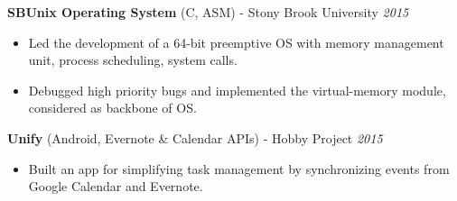 \documentclass[12pt]{article}
\newcommand{\sectionHeading}[1]{
\vspace{-15pt}
\section*{\small{#1}}
\vspace{-10pt}
\hrule
\vspace{8pt}
}
\newcommand {\projectSectionSubheading}[4]{
    \noindent \small{\textbf{#1} \textit{(#2)} : #3  \hfill \textit{#4}} \\
    \vspace{-10pt}
}
\newcommand {\projectSectionSubheadingAlternate}[4]{
    \noindent \small{\textbf{#1} (#3) - #2 \hfill \textit{#4}} \\
    \vspace{-22pt}
}
\newcommand {\projectSectionSubheadingAlternateNew}[2]{
    \noindent \small{\textbf{#1} \hfill \textit{#2}} \\
    \vspace{-22pt}
}
\newcommand{\sectionListStart}{
    \begin{itemize}[label={\small{\textbullet}}, leftmargin=20pt] %
}
\newcommand{\sectionListEnd}{\end{itemize} \vspace{-5pt}}
\newcommand{\sectionListItem}[1]{\item \small{#1}}
\begin{document}
\projectSectionSubheadingAlternate{SBUnix Operating System}{Stony Brook University}{C, ASM}{2015}
\sectionListStart
    \sectionListItem
        Led the development of a 64-bit preemptive OS with  memory management unit, process scheduling, system calls. 
    \sectionListItem
        Debugged high priority bugs and implemented the virtual-memory module, considered as backbone of OS.
\sectionListEnd
    
\projectSectionSubheadingAlternate{Unify}{Hobby Project}{Android, Evernote \& Calendar APIs}{2015}
\sectionListStart
    \sectionListItem
        Built an app for simplifying task management by synchronizing events from Google Calendar and Evernote. 
        
\sectionListEnd









\end{document}
